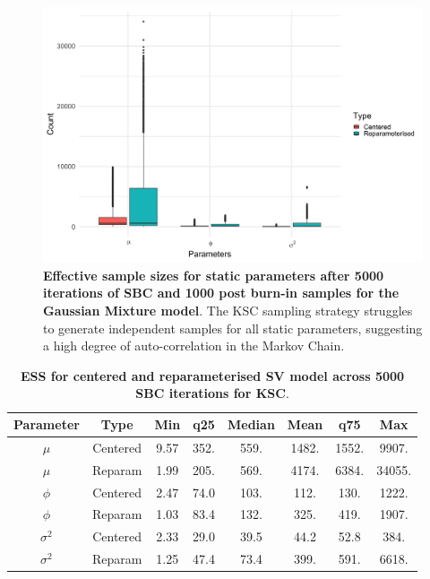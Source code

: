 \documentclass[12pt, a4paper]{article}
\begin{document}

    \begin{figure}[H]
        \centering
        \includegraphics[scale=0.1]{results/ksc_ess.png}
        \caption{\textbf{Effective sample sizes for static parameters after 5000 iterations of SBC and 1000 post burn-in samples for the Gaussian Mixture model}. The KSC sampling strategy struggles to generate independent samples for all static parameters, suggesting a high degree of auto-correlation in the Markov Chain.}
        \label{fig:kscess}
    \end{figure}

    \begin{table}[H]
        \centering
        \begin{tabular}{|c|c|c|c|c|c|c|c|} \hline 
        Parameter &  Type&Min& q25&  Median& Mean & q75&Max\\ \hline 
        $\mu$&  Centered&9.57 & 352. & 559. & 1482. & 1552. & 9907.\\
     $\mu$&  Reparam&1.99 & 205. & 569. & 4174. & 6384. & 34055.\\\hline 
     $\phi$&  Centered&2.47 & 74.0 & 103. & 112. & 130. & 1222.\\
     $\phi$&  Reparam&1.03 & 83.4 & 132. & 325. & 419. & 1907. \\ \hline 
     $\sigma^2$&  Centered&2.33 & 29.0 & 39.5 & 44.2 & 52.8 & 384. \\ 
     $\sigma^2$&  Reparam&1.25 & 47.4 & 73.4 & 399. & 591. & 6618. \\ \hline
        \end{tabular}
        \caption{\textbf{ESS for centered and reparameterised SV model across 5000 SBC iterations for KSC}.}
        \label{tab:kscess}
    \end{table}
\end{document}
